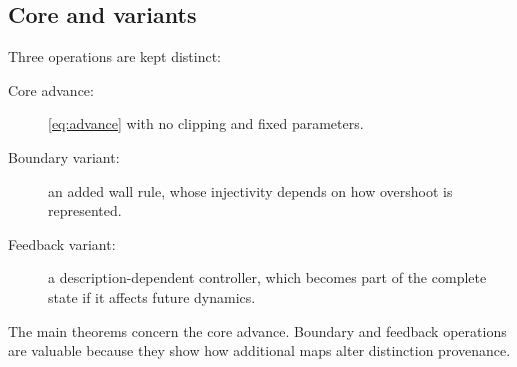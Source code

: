 \subsection{Core and variants}

Three operations are kept distinct:
\begin{description}
\item[Core advance:] \cref{eq:advance} with no clipping and fixed parameters.
\item[Boundary variant:] an added wall rule, whose injectivity depends on how overshoot is represented.
\item[Feedback variant:] a description-dependent controller, which becomes part of the complete state if it affects future dynamics.
\end{description}
The main theorems concern the core advance. Boundary and feedback operations are valuable because they show how additional maps alter distinction provenance.
